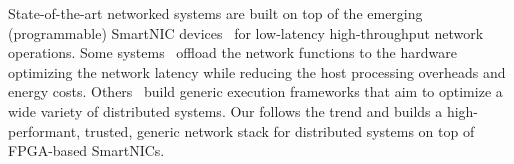 

 State-of-the-art networked systems are built on top of the emerging (programmable) SmartNIC devices~\cite{liquidIO_smartnics, u280_smartnics, bluefield_smartnics, broadcom_smartnics, netronome_smartnics, alibaba_smartnics, nitro_smartnics, msr_smartnics} for low-latency high-throughput network operations. Some systems~\cite{246498, 211249, 10.1145/3387514.3405895, 10.1145/3365609.3365851, 10.1145/3127479.3132252, 10.1145/2934872.2934897, 258971, 246486, 179716, 227655, 10.1145/3286062.3286068, shan2022supernic}  offload the network functions to the hardware optimizing the network latency while reducing the host processing overheads and energy costs. Others~\cite{10.1145/3341302.3342079, 10.1145/2872362.2872367, 234944, 9220629, 6853195, 10.1145/3477132.3483555, 280678, 10.1145/3132747.3132756, honeycomb} build generic execution frameworks that aim to optimize a wide variety of distributed systems. Our \projecttitle{} follows the trend and builds a high-performant, trusted, generic network stack for distributed systems on top of FPGA-based SmartNICs.





